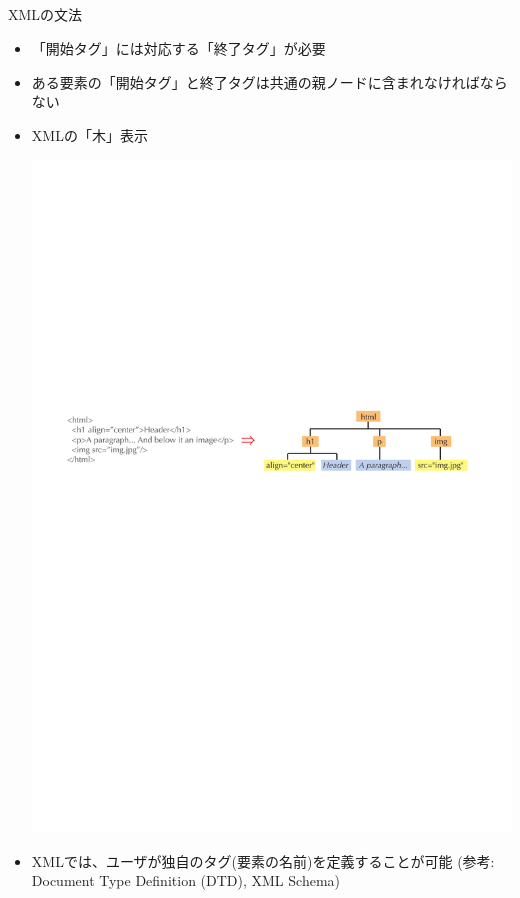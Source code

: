 \subsection*{\redm\whitem\greenb}
\begin{frame}{XMLの文法}
  \begin{itemize}
  \item 「開始タグ」には対応する「終了タグ」が必要
  \item ある要素の「開始タグ」と終了タグは共通の親ノードに含まれなければならない
  \item XMLの「木」表示
  \begin{center}
    \includegraphics[width=\textwidth]{xml2.pdf}
  \end{center}
  \item XMLでは、ユーザが独自のタグ(要素の名前)を定義することが可能 (参考: Document Type Definition (DTD), XML Schema)
  \end{itemize}
\end{frame}

